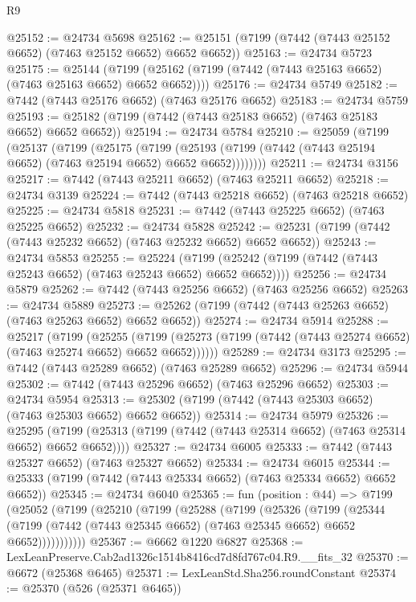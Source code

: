 \begin{lexlean}{R9}
\begin{coremodule}
@25152 := @24734 @5698
@25162 := @25151 (@7199 (@7442 (@7443 @25152 @6652) (@7463 @25152 @6652) @6652 @6652))
@25163 := @24734 @5723
@25175 := @25144
    (@7199 (@25162 (@7199 (@7442 (@7443 @25163 @6652) (@7463 @25163 @6652) @6652 @6652))))
@25176 := @24734 @5749
@25182 := @7442 (@7443 @25176 @6652) (@7463 @25176 @6652)
@25183 := @24734 @5759
@25193 := @25182 (@7199 (@7442 (@7443 @25183 @6652) (@7463 @25183 @6652) @6652 @6652))
@25194 := @24734 @5784
@25210 := @25059
    (@7199
      (@25137
        (@7199
          (@25175
            (@7199
              (@25193 (@7199 (@7442 (@7443 @25194 @6652) (@7463 @25194 @6652) @6652 @6652))))))))
@25211 := @24734 @3156
@25217 := @7442 (@7443 @25211 @6652) (@7463 @25211 @6652)
@25218 := @24734 @3139
@25224 := @7442 (@7443 @25218 @6652) (@7463 @25218 @6652)
@25225 := @24734 @5818
@25231 := @7442 (@7443 @25225 @6652) (@7463 @25225 @6652)
@25232 := @24734 @5828
@25242 := @25231 (@7199 (@7442 (@7443 @25232 @6652) (@7463 @25232 @6652) @6652 @6652))
@25243 := @24734 @5853
@25255 := @25224
    (@7199 (@25242 (@7199 (@7442 (@7443 @25243 @6652) (@7463 @25243 @6652) @6652 @6652))))
@25256 := @24734 @5879
@25262 := @7442 (@7443 @25256 @6652) (@7463 @25256 @6652)
@25263 := @24734 @5889
@25273 := @25262 (@7199 (@7442 (@7443 @25263 @6652) (@7463 @25263 @6652) @6652 @6652))
@25274 := @24734 @5914
@25288 := @25217
    (@7199
      (@25255
        (@7199 (@25273 (@7199 (@7442 (@7443 @25274 @6652) (@7463 @25274 @6652) @6652 @6652))))))
@25289 := @24734 @3173
@25295 := @7442 (@7443 @25289 @6652) (@7463 @25289 @6652)
@25296 := @24734 @5944
@25302 := @7442 (@7443 @25296 @6652) (@7463 @25296 @6652)
@25303 := @24734 @5954
@25313 := @25302 (@7199 (@7442 (@7443 @25303 @6652) (@7463 @25303 @6652) @6652 @6652))
@25314 := @24734 @5979
@25326 := @25295
    (@7199 (@25313 (@7199 (@7442 (@7443 @25314 @6652) (@7463 @25314 @6652) @6652 @6652))))
@25327 := @24734 @6005
@25333 := @7442 (@7443 @25327 @6652) (@7463 @25327 @6652)
@25334 := @24734 @6015
@25344 := @25333 (@7199 (@7442 (@7443 @25334 @6652) (@7463 @25334 @6652) @6652 @6652))
@25345 := @24734 @6040
@25365 := fun (position : @44) =>
  @7199
    (@25052
      (@7199
        (@25210
          (@7199
            (@25288
              (@7199
                (@25326
                  (@7199
                    (@25344
                      (@7199 (@7442 (@7443 @25345 @6652) (@7463 @25345 @6652) @6652 @6652)))))))))))
@25367 := @6662 @1220 @6827
@25368 := LexLeanPreserve.Cab2ad1326c1514b8416cd7d8fd767c04.R9.__fits_32
@25370 := @6672 (@25368 @6465)
@25371 := LexLeanStd.Sha256.roundConstant
@25374 := @25370 (@526 (@25371 @6465))

\end{coremodule}
\end{lexlean}
